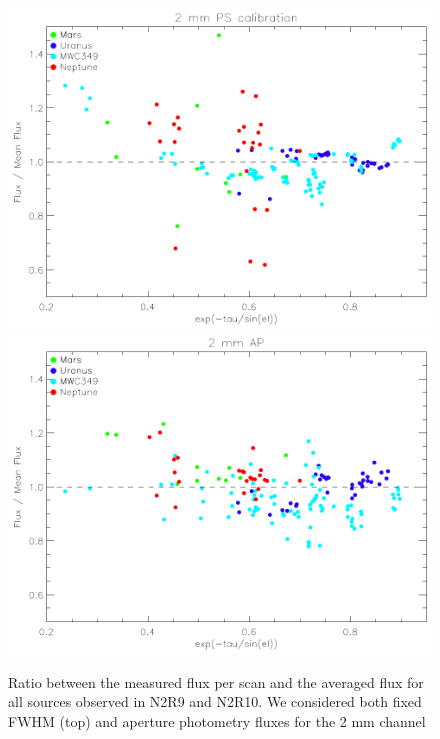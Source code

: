 \begin{figure}[ht]
\begin{center}
\includegraphics[clip, angle=0, scale = 0.7]{Figures/flux_2mm_ratio_run22_23.pdf}
\includegraphics[clip, angle=0, scale = 0.7]{Figures/flux_2mm_ap_ratio_run22_23.pdf}
\caption[N2R9 and N2R10 2mm flux stability ]{Ratio between the measured flux per scan and the averaged flux for all sources observed in N2R9 and N2R10. We considered both fixed FWHM (top) and aperture photometry fluxes for the 2 mm channel }
\label{fig:fluxvsscan}
\end{center}
\end{figure}
